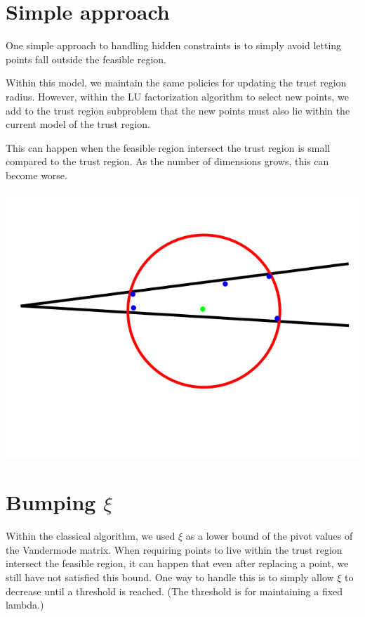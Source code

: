 \documentclass{article}
\begin{document}
\section{Simple approach}
One simple approach to handling hidden constraints is to simply avoid letting points fall outside the feasible region.

Within this model, we maintain the same policies for updating the trust region radius.
However, within the LU factorization algorithm to select new points, we add to the trust region subproblem that the new points must also lie within the current model of the trust region.

This can happen when the feasible region intersect the trust region is small compared to the trust region.
As the number of dimensions grows, this can become worse.

\includegraphics[scale=0.4]{bad_lambda.png}

\section{Bumping $\xi$}


Within the classical algorithm, we used $\xi$ as a lower bound of the pivot values of the Vandermode matrix.
When requiring points to live within the trust region intersect the feasible region, it can happen that even after replacing a point, we still have not satisfied this bound.
One way to handle this is to simply allow $\xi$ to decrease until a threshold is reached.
(The threshold is for maintaining a fixed lambda.)
\end{document}
